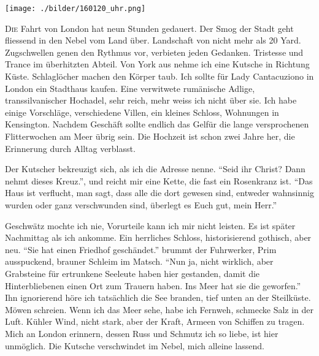 ﻿\thispagestyle{empty}
\begin{center}
\texttt{[image: ./bilder/160120\_uhr.png]}
\end{center}
\vspace*{\fill}
{\centering\fontsize{50}{48} \color{farbe}\par}
\newpage
\lettrine[lines=3, lhang=.2, loversize=.25, lraise=0.05, findent=0.1em,
nindent=0em]{D}{ie} Fahrt von London hat neun Stunden gedauert. Der Smog der Stadt geht fliessend in den Nebel vom Land über. Landschaft von nicht mehr als 20 Yard. Zugschwellen genen den Rythmus vor, verbieten jeden Gedanken. Tristesse und Trance im überhitzten Abteil. Von York aus nehme ich eine Kutsche in Richtung Küste. Schlaglöcher machen den Körper taub. Ich sollte für Lady Cantacuziono in London ein Stadthaus kaufen. Eine verwitwete rumänische Adlige, transsilvanischer Hochadel, sehr reich, mehr weiss ich nicht über sie. Ich habe einige Vorschläge, verschiedene Villen, ein kleines Schloss, Wohnungen in Kensington. Nachdem Geschäft sollte endlich das Gelfür die lange versprochenen Flitterwochen am Meer übrig sein. Die Hochzeit ist schon zwei Jahre her, die Erinnerung durch Alltag verblasst.

Der Kutscher bekreuzigt sich, als ich die Adresse nenne. \enquote{Seid ihr Christ? Dann nehmt dieses Kreuz.}, und reicht mir eine Kette, die fast ein Rosenkranz ist. \enquote{Das Haus ist verflucht, man sagt, dass alle die dort gewesen sind, entweder wahnsinnig wurden oder ganz verschwunden sind, überlegt es Euch gut, mein Herr.} 

Geschwätz mochte ich nie, Vorurteile kann ich mir nicht leisten. Es ist später Nachmittag als ich ankomme. Ein herrliches Schloss, historisierend gothisch, aber neu. \enquote{Sie hat einen Friedhof geschändet.} brummt der Fuhrwerker, Prim ausspuckend, brauner Schleim im Matsch. \enquote{Nun ja, nicht wirklich, aber Grabsteine für ertrunkene Seeleute haben hier gestanden, damit die Hinterbliebenen einen Ort zum Trauern haben. Ins Meer hat sie die geworfen.} Ihn ignorierend höre ich tatsächlich die See branden, tief unten an der Steilküste. Möwen schreien. Wenn ich das Meer sehe, habe ich Fernweh, schmecke Salz in der Luft. Kühler Wind, nicht stark, aber der Kraft, Armeen von Schiffen zu tragen. Mich an London erinnern, dessen Russ und Schmutz ich so liebe, ist hier unmöglich. Die Kutsche verschwindet im Nebel, mich alleine lassend.

